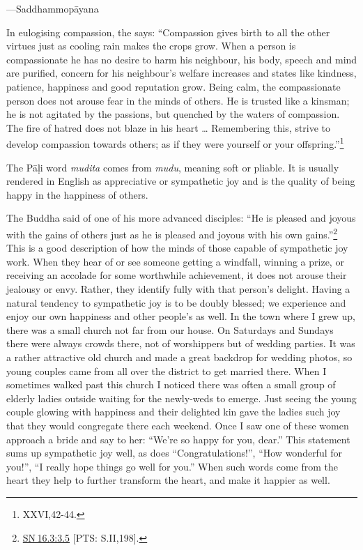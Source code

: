 \documentclass[10pt, openright]{book}
\newenvironment{epigram-2-cite}%
{%
\quoting[leftmargin=2.5cm,rightmargin=2.5cm]%
\noindent\normal\hspace*{\fill} 
}%
{\endquoting\vspace{1em}
}%
\begin{document}
\begin{epigram-2-cite}
—Saddhammopāyana
\end{epigram-2-cite}

In eulogising compassion, the \cite{Jātakamāla} says: “Compassion gives birth to all the other virtues just as cooling rain makes the crops grow. When a person is compassionate he has no desire to harm his neighbour, his body, speech and mind are purified, concern for his neighbour’s welfare increases and states like kindness, patience, happiness and good reputation grow. Being calm, the compassionate person does not arouse fear in the minds of others. He is trusted like a kinsman; he is not agitated by the passions, but quenched by the waters of compassion. The fire of hatred does not blaze in his heart … Remembering this, strive to develop compassion towards others; as if they were yourself or your offspring.”\footnote {\cite{Jātakamāla} XXVI,42-44.}


The Pāḷi word \textit{mudita} comes from \textit{mudu}, meaning soft or pliable. It is usually rendered in English as appreciative or sympathetic joy and is the quality of being happy in the happiness of others.


The Buddha said of one of his more advanced disciples: “He is pleased and joyous with the gains of others just as he is pleased and joyous with his own gains.”\footnote {\href{https://suttacentral.net/sn16.3/en/sujato\#3.5}{SN 16.3:3.5} [PTS: S.II,198].} This is a good description of how the minds of those capable of sympathetic joy work. When they hear of or see someone getting a windfall, winning a prize, or receiving an accolade for some worthwhile achievement, it does not arouse their jealousy or envy. Rather, they identify fully with that person’s delight. Having a natural tendency to sympathetic joy is to be doubly blessed; we experience and enjoy our own happiness and other people’s as well. In the town where I grew up, there was a small church not far from our house. On Saturdays and Sundays there were always crowds there, not of worshippers but of wedding parties. It was a rather attractive old church and made a great backdrop for wedding photos, so young couples came from all over the district to get married there. When I sometimes walked past this church I noticed there was often a small group of elderly ladies outside waiting for the newly-weds to emerge. Just seeing the young couple glowing with happiness and their delighted kin gave the ladies such joy that they would congregate there each weekend. Once I saw one of these women approach a bride and say to her: “We’re so happy for you, dear.” This statement sums up sympathetic joy well, as does “Congratulations!”, “How wonderful for you!”, “I really hope things go well for you.” When such words come from the heart they help to further transform the heart, and make it happier as well.
\end{document}
